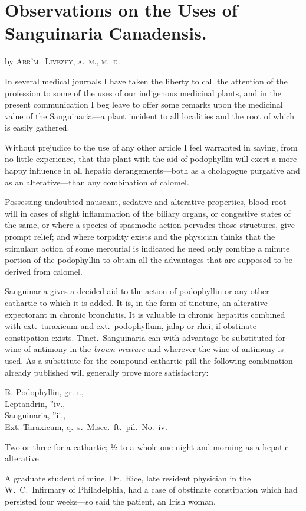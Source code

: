 \chapter[Observations on the Uses of Sanguinaria
Canadensis][Observations on Sanguinaria
Canadensis]{Observations on the Uses of Sanguinaria
Canadensis.}

by \textsc{Abr'm.\ Livezey, a.\ m., m.\ d.}

In several medical journals I have taken the liberty to call the attention
of the profession to some of the uses of our indigenous medicinal
plants, and in the present communication I beg leave to offer some
remarks upon the medicinal value of the Sanguinaria---a plant incident
to all localities and the root of which is easily gathered.

Without prejudice to the use of any other article I feel warranted in
saying, from no little experience, that this plant with the aid of podophyllin
will exert a more happy influence in all hepatic derangements---both
as a cholagogue purgative and as an alterative---than any combination
of calomel.

Possessing undoubted nauseant, sedative and alterative properties,
blood-root will in cases of slight inflammation of the biliary organs, or
congestive states of the same, or where a species of spasmodic action
pervades those structures, give prompt relief; and where torpidity
exists and the physician thinks that the stimulant action of some mercurial
is indicated he need only combine a minute portion of the
podophyllin to obtain all the advantages that are supposed to be
derived from calomel.

Sanguinaria gives a decided aid to the action of podophyllin or any
other cathartic to which it is added.   It is, in the form of tincture, an
alterative expectorant in chronic bronchitis.   It is valuable in chronic
hepatitis combined with ext.\ taraxicum and ext.\ podophyllum, jalap or
rhei, if obstinate constipation exists.    Tinct.\ Sanguinaria can with
advantage be substituted for wine of antimony in the \emph{brown mixture}
and wherever the wine of antimony is used.   As a substitute for the
compound cathartic pill the following combination---already published
will generally prove more satisfactory:

\begin{center}
\begin{tabbing}
  \textsf{℞}. \= Podophyllin, \=gr. \=i., \\
    \> Leptandrin, \>''\>iv., \\
    \> Sanguinaria, \>''\>ii., \\
    \> Ext. Taraxicum, q.\ s.\ Misce.\ ft.\ pil.\ No.\ iv. \\
\end{tabbing}
\end{center}
Two or three for a cathartic; ½ to a whole one night and morning as a
hepatic alterative.

A graduate student of mine, Dr.\ Rice, late resident physician in the
W.\ C.\ Infirmary of Philadelphia, had a case of obstinate constipation
which had persisted four weeks---so said the patient, an Irish woman,\endinput